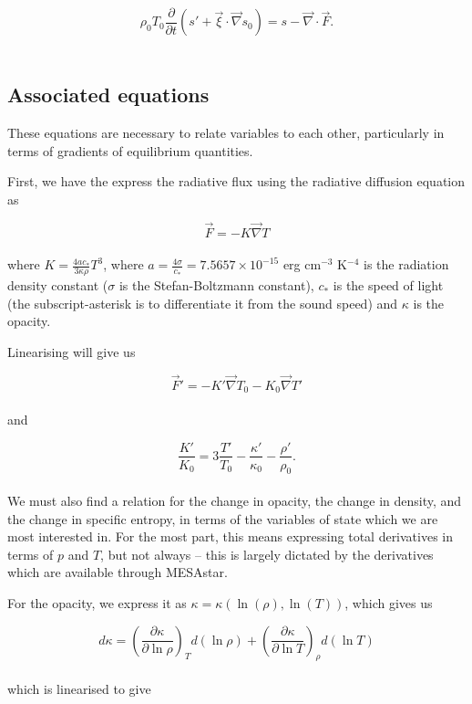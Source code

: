 \documentclass[11pt]{amsart}
\begin{document}
\begin{equation}
\rho_{0} T_{0} \frac{\partial}{\partial t} \left( s' + \vec{\xi} \cdot \vec{\nabla} s_{0} \right)
= s - \vec{\nabla} \cdot \vec{F}.
\end{equation}
\\

\subsection{Associated equations}

These equations are necessary to relate variables to each other, particularly in terms of gradients of
equilibrium quantities.

First, we have the express the radiative flux using the radiative diffusion equation as

\begin{equation}
\vec{F} = - K \vec{\nabla} T
\end{equation}
\\
where $K = \frac{4 a c_{*}}{3 \kappa \rho} T^{3}$, where $a = \frac{4 \sigma}{c_{*}} = 7.5657 \times 10^{-15}$ 
erg cm$^{-3}$ K$^{-4}$ is the radiation density constant ($\sigma$ is the Stefan-Boltzmann constant),
$c_{*}$ is the speed of light (the subscript-asterisk is to differentiate it from the sound speed) 
and $\kappa$ is the opacity.

Linearising will give us

\begin{equation}
\vec{F}' = - K' \vec{\nabla} T_{0} - K_{0} \vec{\nabla} T'
\end{equation}
\\
and

\begin{equation}
\frac{K'}{K_{0}} = 3 \frac{T'}{T_{0}} - \frac{\kappa'}{\kappa_{0}} - \frac{\rho'}{\rho_{0}}.
\end{equation}
\\

We must also find a relation for the change in opacity, the change in density, and the change in specific entropy,
in terms of the variables of state which we are most interested in.  For the most part, this
means expressing total derivatives in terms of $p$ and $T$, but not always -- this is largely
dictated by the derivatives which are available through MESAstar.

For the opacity, we express it as $\kappa = \kappa \left( \ln (\rho) , \ln(T) \right)$, which gives us

\begin{equation}
d\kappa = \left( \frac{\partial \kappa}{\partial \ln \rho} \right)_{T} d(\ln \rho) + \left( \frac{\partial \kappa}{\partial \ln T} \right)_{\rho} d(\ln T)
\end{equation}
\\
which is linearised to give
\end{document}
